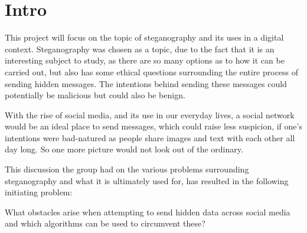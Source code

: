\section*{Intro}
This project will focus on the topic of steganography and its uses in a digital context. 
Steganography was chosen as a topic, due to the fact that it is an interesting subject to study, as there are so many options as to how it can be carried out, but also has some ethical questions surrounding the entire process of sending hidden messages. 
The intentions behind sending these messages could potentially be malicious but could also be benign.

With the rise of social media, and its use in our everyday lives, a social network would be an ideal place to send messages, which could raise less suspicion, if one's intentions were bad-natured as people share images and text with each other all day long. 
So one more picture would not look out of the ordinary. 

This discussion the group had on the various problems surrounding steganography and what it is ultimately used for, has resulted in the following initiating problem:
\begin{tcolorbox}
What obstacles arise when attempting to send hidden data across social media and which algorithms can be used to circumvent these?
\end{tcolorbox}
